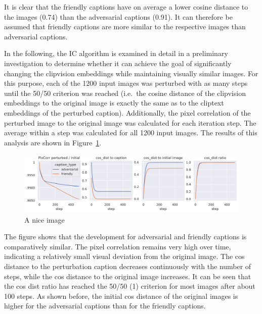 It is clear that the friendly captions have on average a lower cosine distance to the images (0.74) than the adversarial captions (0.91). It can therefore be assumed that friendly captions are more similar to the respective images than adversarial captions. 

In the following, the IC algorithm is examined in detail in a preliminary investigation to determine whether it can achieve the goal of significantly changing the clipvision embeddings while maintaining visually similar images. For this purpose, each of the 1200 input images was perturbed with as many steps until the 50/50 criterion was reached (i.e.\ the cosine distance of the clipvision embeddings to the original image is exactly the same as to the cliptext embeddings of the perturbed caption). Additionally, the pixel correlation of the perturbed image to the original image was calculated for each iteration step. The average within a step was calculated for all 1200 input images. The results of this analysis are shown in Figure~\ref{fig:advpert_validation_ic_loss_curves}. 


\begin{figure}[ht]
    \centering
    \includegraphics[width=1\textwidth]{plots/advpert_validation_ic_loss_curves.png}
    \caption{A nice image}\label{fig:advpert_validation_ic_loss_curves}
\end{figure}

The figure shows that the development for adversarial and friendly captions is comparatively similar. The pixel correlation remains very high over time, indicating a relatively small visual deviation from the original image. The cos distance to the perturbation caption decreases continuously with the number of steps, while the cos distance to the original image increases. It can be seen that the cos dist ratio has reached the 50/50 (1) criterion for most images after about 100 steps. As shown before, the initial cos distance of the original images is higher for the adversarial captions than for the friendly captions.

